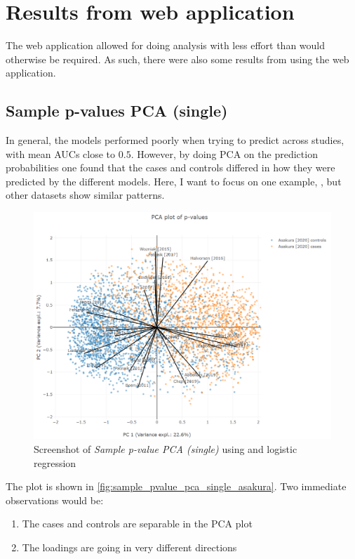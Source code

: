 {{{{{{{{{{{{{{{\section{Results from web application}
\label{sec:res_results_from_web}
The web application allowed for doing analysis with less effort than would otherwise be required. As such, there were also some results from using the web application.

\subsection{Sample p-values PCA (single)}

In general, the models performed poorly when trying to predict across studies, with mean AUCs close to $0.5$. However, by doing PCA on the prediction probabilities one found that the cases and controls differed in how they were predicted by the different models. Here, I want to focus on one example, \citet{Asakura2020}, but other datasets show similar patterns.

\begin{figure}
    \centering
    \includegraphics[width=\textwidth]{figs/webapp_screenshots/sample_pvalue_pca_single_asakura.png}
    \caption{Screenshot of \textit{Sample p-value PCA (single)} using \citet{Asakura2020} and logistic regression}
    \label{fig:sample_pvalue_pca_single_asakura}
\end{figure}

The plot is shown in \autoref{fig:sample_pvalue_pca_single_asakura}. Two immediate observations would be:
\begin{enumerate}
    \item The cases and controls are separable in the PCA plot
    \item The loadings are going in very different directions
\end{enumerate}

}}}}}}}}}}}}}}}

